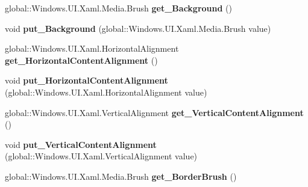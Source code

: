 \begin{DoxyCompactItemize}
global\+::\+Windows.\+U\+I.\+Xaml.\+Media.\+Brush {\bfseries get\+\_\+\+Background} ()
\item 
\mbox{\label{interface_windows_1_1_u_i_1_1_xaml_1_1_controls_1_1_i_content_presenter4_a052301695cb479ae10c998256c35d352}} 
void {\bfseries put\+\_\+\+Background} (global\+::\+Windows.\+U\+I.\+Xaml.\+Media.\+Brush value)
\item 
\mbox{\label{interface_windows_1_1_u_i_1_1_xaml_1_1_controls_1_1_i_content_presenter4_a09a08983436a09edb0fcc2b73c746b45}} 
global\+::\+Windows.\+U\+I.\+Xaml.\+Horizontal\+Alignment {\bfseries get\+\_\+\+Horizontal\+Content\+Alignment} ()
\item 
\mbox{\label{interface_windows_1_1_u_i_1_1_xaml_1_1_controls_1_1_i_content_presenter4_ae336a6680b3867b8c159d802caafbe13}} 
void {\bfseries put\+\_\+\+Horizontal\+Content\+Alignment} (global\+::\+Windows.\+U\+I.\+Xaml.\+Horizontal\+Alignment value)
\item 
\mbox{\label{interface_windows_1_1_u_i_1_1_xaml_1_1_controls_1_1_i_content_presenter4_acb36f5224b57a6975ff61aeee1ab5f74}} 
global\+::\+Windows.\+U\+I.\+Xaml.\+Vertical\+Alignment {\bfseries get\+\_\+\+Vertical\+Content\+Alignment} ()
\item 
\mbox{\label{interface_windows_1_1_u_i_1_1_xaml_1_1_controls_1_1_i_content_presenter4_adb058d58f1fe8cb9afcc0b94b026986c}} 
void {\bfseries put\+\_\+\+Vertical\+Content\+Alignment} (global\+::\+Windows.\+U\+I.\+Xaml.\+Vertical\+Alignment value)
\item 
\mbox{\label{interface_windows_1_1_u_i_1_1_xaml_1_1_controls_1_1_i_content_presenter4_ac7fd7fd864af0f81ad392923c67a8104}} 
global\+::\+Windows.\+U\+I.\+Xaml.\+Media.\+Brush {\bfseries get\+\_\+\+Border\+Brush} ()
\item 
\mbox{\label{interface_windows_1_1_u_i_1_1_xaml_1_1_controls_1_1_i_content_presenter4_a4bf1431ff8dce2bcdba162ef10e0f159}} 

\end{DoxyCompactItemize}
